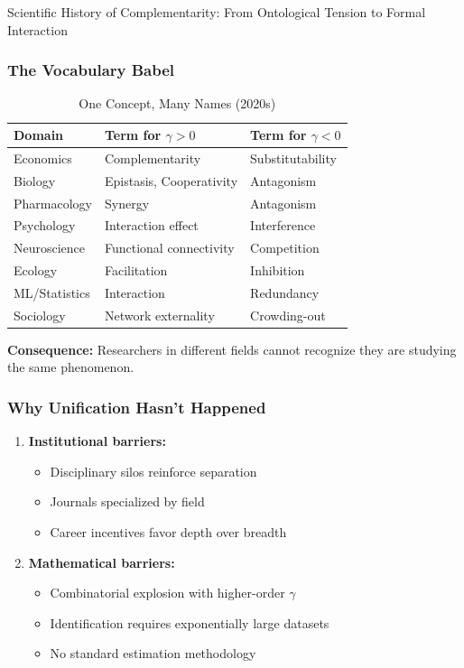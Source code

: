 \begin{chapter}{Scientific History of Complementarity: From Ontological Tension to Formal Interaction}
\subsubsection{The Vocabulary Babel}

\begin{table}[h]
\centering
\caption{One Concept, Many Names (2020s)}
\label{tab:vocabulary-babel}
\renewcommand{\arraystretch}{1.2}
\small
\begin{tabular}{@{}lll@{}}
\toprule
\textbf{Domain} & \textbf{Term for $\gamma > 0$} & \textbf{Term for $\gamma < 0$} \\
\midrule
Economics & Complementarity & Substitutability \\
Biology & Epistasis, Cooperativity & Antagonism \\
Pharmacology & Synergy & Antagonism \\
Psychology & Interaction effect & Interference \\
Neuroscience & Functional connectivity & Competition \\
Ecology & Facilitation & Inhibition \\
ML/Statistics & Interaction & Redundancy \\
Sociology & Network externality & Crowding-out \\
\bottomrule
\end{tabular}
\end{table}

\textbf{Consequence:} Researchers in different fields cannot recognize they are studying the same phenomenon.

\subsubsection{Why Unification Hasn't Happened}

\begin{enumerate}
    \item \textbf{Institutional barriers:}
    \begin{itemize}[noitemsep]
        \item Disciplinary silos reinforce separation
        \item Journals specialized by field
        \item Career incentives favor depth over breadth
    \end{itemize}

    \item \textbf{Mathematical barriers:}
    \begin{itemize}[noitemsep]
        \item Combinatorial explosion with higher-order $\gamma$
        \item Identification requires exponentially large datasets
        \item No standard estimation methodology
    \end{itemize}


\end{enumerate}
\end{chapter}
